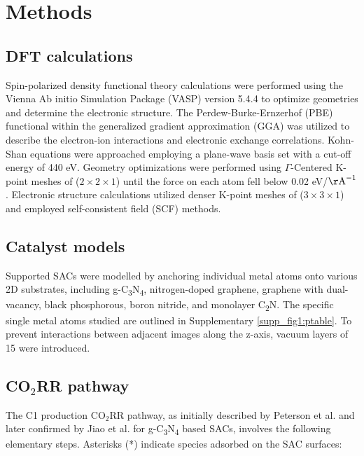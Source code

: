 
\section{Methods}
\label{main_sec_methods}

\subsection{DFT calculations}
Spin-polarized density functional theory calculations were performed using the Vienna Ab initio Simulation Package (VASP) version 5.4.4 \cite{kresse1996efficient, kresse1996efficiency, kresse1993ab} to optimize geometries and determine the electronic structure.
The Perdew-Burke-Ernzerhof (PBE) functional \cite{kresse1996efficient} within the generalized gradient approximation (GGA) \cite{perdew1996generalized} was utilized to describe the electron-ion interactions and electronic exchange correlations.
Kohn-Shan equations were approached employing a plane-wave basis set with a cut-off energy of 440 eV.
Geometry optimizations were performed using $\Gamma$-Centered K-point meshes of ($2\times2\times1$) until the force on each atom fell below 0.02 eV/\(\mathrm{\AA}^{-1}\).
Electronic structure calculations utilized denser K-point meshes of ($3\times3\times1$) and employed self-consistent field (SCF) methods.

\subsection{Catalyst models}
Supported SACs were modelled by anchoring individual metal atoms onto various 2D substrates,
including g-C\textsubscript{3}N\textsubscript{4}, nitrogen-doped graphene,
graphene with dual-vacancy, black phosphorous, boron nitride, and monolayer C\textsubscript{2}N.
The specific single metal atoms studied are outlined in Supplementary \cref{supp_fig1:ptable}.
To prevent interactions between adjacent images along the z-axis, vacuum layers of 15 \text{\AA} were introduced.

\subsection{CO$_2$RR pathway}
The C1 production CO$_2$RR pathway, as initially described by Peterson et al. \cite{peterson2010copper} and later confirmed by Jiao et al. \cite{jiao2017molecular} for g-C\textsubscript{3}N\textsubscript{4} based SACs, involves the following elementary steps.
Asterisks (*) indicate species adsorbed on the SAC surfaces:

